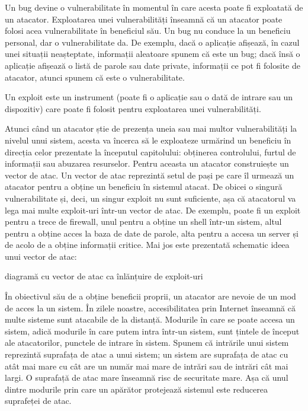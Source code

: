 Un bug devine o vulnerabilitate în momentul în care acesta poate fi exploatată de un atacator. Exploatarea unei vulnerabilități înseamnă că un atacator poate folosi acea vulnerabilitate în beneficiul său. Un bug nu conduce la un beneficiu personal, dar o vulnerabilitate da. De exemplu, dacă o aplicație afișează, în cazul unei situații neașteptate, informații aleatoare spunem că este un bug; dacă însă o aplicație afișează o listă de parole sau date private, informații ce pot fi folosite de atacator, atunci spunem că este o vulnerabilitate.

Un exploit este un instrument (poate fi o aplicație sau o dată de intrare sau un dispozitiv) care poate fi folosit pentru exploatarea unei vulnerabilități.

Atunci când un atacator știe de prezența uneia sau mai multor vulnerabilități la nivelul unui sistem, acesta va încerca să le exploateze urmărind un beneficiu în direcția celor prezentate la începutul capitolului: obținerea controlului, furtul de informații sau abuzarea resurselor. Pentru aceasta un atacator construiește un vector de atac. Un vector de atac reprezintă setul de pași pe care îl urmează un atacator pentru a obține un beneficiu în sistemul atacat. De obicei o singură vulnerabilitate și, deci, un singur exploit nu sunt suficiente, așa că atacatorul va lega mai multe exploit-uri într-un vector de atac. De exemplu, poate fi un exploit pentru a trece de firewall, unul pentru a obține un shell într-un sistem, altul pentru a obține acces la baza de date de parole, alta pentru a accesa un server și de acolo de a obține informații critice. Mai jos este prezentată schematic ideea unui vector de atac:

diagramă cu vector de atac ca înlănțuire de exploit-uri

În obiectivul său de a obține beneficii proprii, un atacator are nevoie de un mod de acces la un sistem. În zilele noastre, accesibilitatea prin Internet înseamnă că multe sisteme sunt atacabile de la distanță. Modurile în care se poate accesa un sistem, adică modurile în care putem intra într-un sistem, sunt țintele de început ale atacatorilor, punctele de intrare în sistem. Spunem că intrările unui sistem reprezintă suprafața de atac a unui sistem; un sistem are suprafața de atac cu atât mai mare cu cât are un număr mai mare de intrări sau de intrări cât mai largi. O suprafață de atac mare înseamnă risc de securitate mare. Așa că unul dintre modurile prin care un apărător protejează sistemul este reducerea suprafeței de atac.

